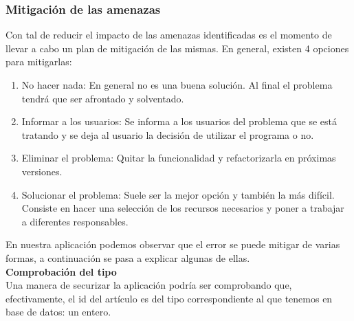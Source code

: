 \documentclass[a4paper,oneside]{article}
\begin{document}
\begin{table}[ht]
\centering
{}
\caption{Valoración DREAD de SQL injection} 
\label{dread}
\end{table} 

\subsubsection{Mitigación de las amenazas}
Con tal de reducir el impacto de las amenazas identificadas es el momento de llevar a cabo un plan de mitigación de las mismas. En general, existen 4 opciones para mitigarlas:
\begin{enumerate}
\item No hacer nada: En general no es una buena solución. Al final el problema tendrá que ser afrontado y solventado.
\item Informar a los usuarios: Se informa a los usuarios del problema que se está tratando y se deja al usuario la decisión de utilizar el programa o no.
\item Eliminar el problema: Quitar la funcionalidad y refactorizarla en próximas versiones.
\item Solucionar el problema: Suele ser la mejor opción y también la más difícil. Consiste en hacer una selección de los recursos necesarios y poner a trabajar a diferentes responsables.
\end{enumerate}

En nuestra aplicación podemos observar que el error se puede mitigar de varias formas, a continuación se pasa a explicar algunas de ellas.\\

\textbf{Comprobación del tipo}\\
Una manera de securizar la aplicación podría ser comprobando que, efectivamente, el id del artículo es del tipo correspondiente al que tenemos en base de datos: un entero.\\


\end{document}
